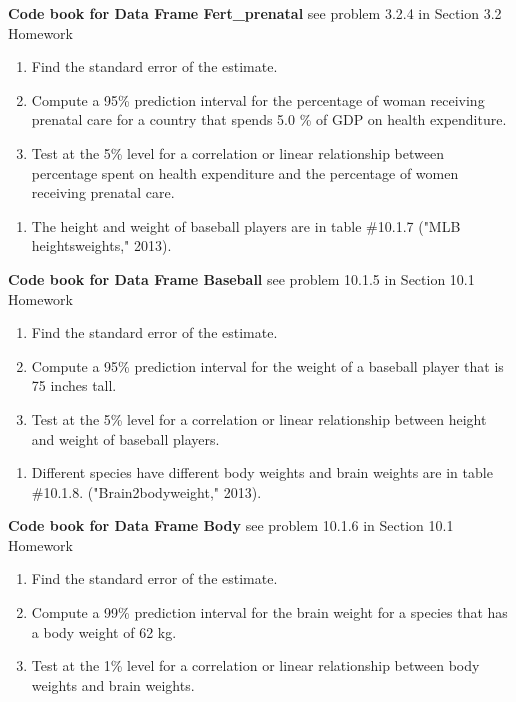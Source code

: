\documentclass[
]{book}
\providecommand{\tightlist}{%
  \setlength{\itemsep}{0pt}\setlength{\parskip}{0pt}}
\begin{document}
\textbf{Code book for Data Frame Fert\_prenatal} see problem 3.2.4 in Section 3.2 Homework

\begin{enumerate}
\def\labelenumi{\alph{enumi}.}
\tightlist
\item
  Find the standard error of the estimate.
\item
  Compute a 95\% prediction interval for the percentage of woman receiving prenatal care for a country that spends 5.0 \% of GDP on health expenditure.
\item
  Test at the 5\% level for a correlation or linear relationship between percentage spent on health expenditure and the percentage of women receiving prenatal care.
\end{enumerate}

\begin{enumerate}
\def\labelenumi{\arabic{enumi}.}
\setcounter{enumi}{4}
\tightlist
\item
  The height and weight of baseball players are in table \#10.1.7 ("MLB heightsweights," 2013).
\end{enumerate}

\textbf{Code book for Data Frame Baseball} see problem 10.1.5 in Section 10.1 Homework

\begin{enumerate}
\def\labelenumi{\alph{enumi}.}
\tightlist
\item
  Find the standard error of the estimate.
\item
  Compute a 95\% prediction interval for the weight of a baseball player that is 75 inches tall.
\item
  Test at the 5\% level for a correlation or linear relationship between height and weight of baseball players.
\end{enumerate}

\begin{enumerate}
\def\labelenumi{\arabic{enumi}.}
\setcounter{enumi}{5}
\tightlist
\item
  Different species have different body weights and brain weights are in table \#10.1.8. ("Brain2bodyweight," 2013).
\end{enumerate}

\textbf{Code book for Data Frame Body} see problem 10.1.6 in Section 10.1 Homework

\begin{enumerate}
\def\labelenumi{\alph{enumi}.}
\tightlist
\item
  Find the standard error of the estimate.
\item
  Compute a 99\% prediction interval for the brain weight for a species that has a body weight of 62 kg.
\item
  Test at the 1\% level for a correlation or linear relationship between body weights and brain weights.
\end{enumerate}
\end{document}
